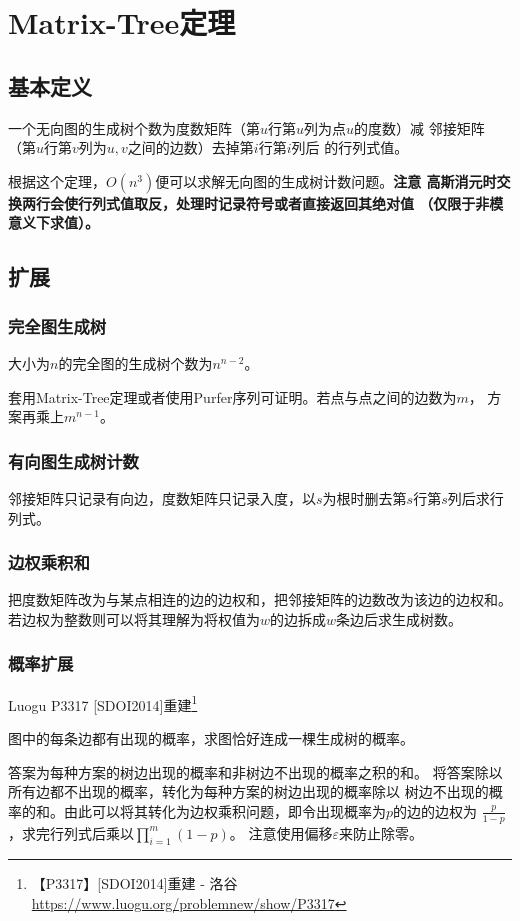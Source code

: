 \section{Matrix-Tree定理}\label{MatrixTree}
\subsection{基本定义}
\begin{theorem}
	一个无向图的生成树个数为度数矩阵（第$u$行第$u$列为点$u$的度数）减
	邻接矩阵（第$u$行第$v$列为$u,v$之间的边数）去掉第$i$行第$i$列后
	的行列式值。
\end{theorem}
根据这个定理，$O(n^3)$便可以求解无向图的生成树计数问题。{\bfseries 注意
高斯消元时交换两行会使行列式值取反，处理时记录符号或者直接返回其绝对值
（仅限于非模意义下求值）。}
\subsection{扩展}
\subsubsection{完全图生成树}
\begin{theorem}
	大小为$n$的完全图的生成树个数为$n^{n-2}$。
\end{theorem}
套用Matrix-Tree定理或者使用Purfer序列可证明。若点与点之间的边数为$m$，
方案再乘上$m^{n-1}$。
\subsubsection{有向图生成树计数}
邻接矩阵只记录有向边，度数矩阵只记录入度，以$s$为根时删去第$s$行第$s$列后求行列式。
\subsubsection{边权乘积和}
把度数矩阵改为与某点相连的边的边权和，把邻接矩阵的边数改为该边的边权和。
若边权为整数则可以将其理解为将权值为$w$的边拆成$w$条边后求生成树数。
\subsubsection{概率扩展}
Luogu P3317 [SDOI2014]重建\footnote{【P3317】[SDOI2014]重建 - 洛谷
\url{https://www.luogu.org/problemnew/show/P3317}
}

图中的每条边都有出现的概率，求图恰好连成一棵生成树的概率。

答案为每种方案的树边出现的概率和非树边不出现的概率之积的和。
将答案除以所有边都不出现的概率，转化为每种方案的树边出现的概率除以
树边不出现的概率的和。由此可以将其转化为边权乘积问题，即令出现概率为$p$的边的边权为
$\frac{p}{1-p}$，求完行列式后乘以$\displaystyle \prod_{i=1}^m{(1-p)}$。
注意使用偏移$\varepsilon$来防止除零。

